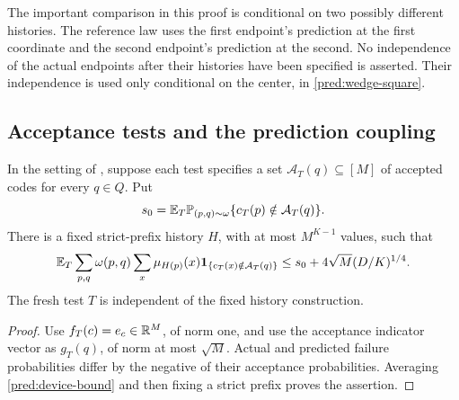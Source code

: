 The important comparison in this proof is conditional on two possibly
different histories.  The reference law uses the first endpoint's prediction
at the first coordinate and the second endpoint's prediction at the second.
No independence of the actual endpoints after their histories have been
specified is asserted.  Their independence is used only conditional on the
center, in \eqref{pred:wedge-square}.

\subsection{Acceptance tests and the prediction coupling}

\begin{corollary}\label{pred:acceptance}
In the setting of , suppose each test specifies a set
\(\mathcal A_T(q)\subseteq[M]\) of accepted codes for every \(q\in Q\).
Put
\[
 s_0=\mathbb E_T\mathbb P_{(p,q)\sim\omega}
                \{c_T(p)\notin\mathcal A_T(q)\}.
\]
There is a fixed strict-prefix history \(H\), with at most \(M^{K-1}\)
values, such that
\begin{equation}\label{pred:acceptance-bound}
 \mathbb E_T\sum_{p,q}\omega(p,q)
       \sum_x\mu_{H(p)}(x)
             \mathbf1_{\{c_T(x)\notin\mathcal A_T(q)\}}
 \le s_0+4\sqrt M(D/K)^{1/4}.
\end{equation}
The fresh test \(T\) is independent of the fixed history construction.
\end{corollary}

\begin{proof}
Use \(f_T(c)=e_c\in\mathbb R^M\), of norm one, and use the acceptance indicator
vector as \(g_T(q)\), of norm at most \(\sqrt M\).  Actual and predicted
failure probabilities differ by the negative of their acceptance
probabilities.  Averaging \eqref{pred:device-bound} and then fixing a strict
prefix proves the assertion.
\end{proof}

